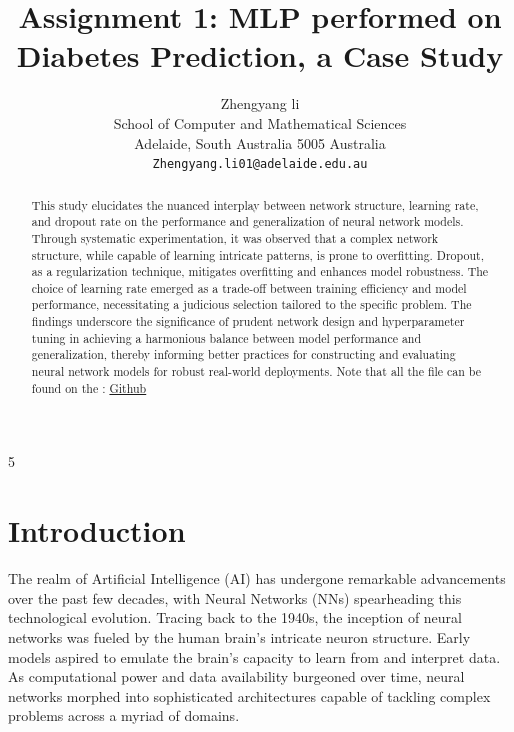 \documentclass[10pt,twocolumn,letterpaper]{article}
\begin{document}
\title{Assignment 1: MLP performed on Diabetes Prediction, a Case Study}

\author{Zhengyang li\\
   School of Computer and Mathematical Sciences\\
   Adelaide, South Australia 5005 Australia\\
   \tt\small Zhengyang.li01@adelaide.edu.au}


\maketitle

\begin{abstract}
   This study elucidates the nuanced interplay between network structure, learning rate, and dropout rate on the performance and generalization of neural network models. Through systematic experimentation, it was observed that a complex network structure, while capable of learning intricate patterns, is prone to overfitting. Dropout, as a regularization technique, mitigates overfitting and enhances model robustness. The choice of learning rate emerged as a trade-off between training efficiency and model performance, necessitating a judicious selection tailored to the specific problem. The findings underscore the significance of prudent network design and hyperparameter tuning in achieving a harmonious balance between model performance and generalization, thereby informing better practices for constructing and evaluating neural network models for robust real-world deployments. Note that all the file can be found on the : \href{https://github.com/David-Lzy/Deep_Learning_Fundamentals}{Github}
\end{abstract}

5\section{Introduction}

The realm of Artificial Intelligence (AI) has undergone remarkable advancements over the past few decades, with Neural Networks (NNs) spearheading this technological evolution. Tracing back to the 1940s, the inception of neural networks was fueled by the human brain's intricate neuron structure. Early models aspired to emulate the brain's capacity to learn from and interpret data. As computational power and data availability burgeoned over time, neural networks morphed into sophisticated architectures capable of tackling complex problems across a myriad of domains.
\end{document}
